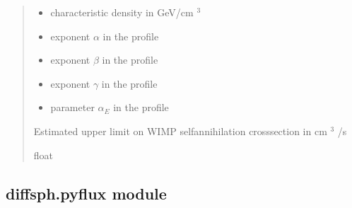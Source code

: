 \documentclass[letterpaper,10pt,english]{sphinxmanual}
\begin{document}
\begin{fulllineitems}
\begin{quote}
\begin{description}
\begin{itemize}
\item {} 
\sphinxAtStartPar
{} \textendash{} characteristic density in GeV/cm \({}^3\)

\item {} 
\sphinxAtStartPar
{} \textendash{} exponent \(\alpha\) in the {\hyperref[\detokenize{diffsph.profiles:diffsph.profiles.templates.hdz}]{}} profile

\item {} 
\sphinxAtStartPar
{} \textendash{} exponent \(\beta\) in the {\hyperref[\detokenize{diffsph.profiles:diffsph.profiles.templates.hdz}]{}} profile

\item {} 
\sphinxAtStartPar
{} \textendash{} exponent \(\gamma\) in the {\hyperref[\detokenize{diffsph.profiles:diffsph.profiles.templates.hdz}]{}} profile

\item {} 
\sphinxAtStartPar
{} \textendash{} parameter \(\alpha_E\) in the {\hyperref[\detokenize{diffsph.profiles:diffsph.profiles.templates.enst}]{}} profile

\end{itemize}

\sphinxAtStartPar
Estimated upper limit on WIMP self\sphinxhyphen{}annihilation cross\sphinxhyphen{}section in cm \({}^3\) /s

\sphinxAtStartPar
float

\end{description}\end{quote}

\end{fulllineitems}



\subsection{diffsph.pyflux module}
\label{\detokenize{diffsph:module-diffsph.pyflux}}\label{\detokenize{diffsph:diffsph-pyflux-module}}
\end{document}
